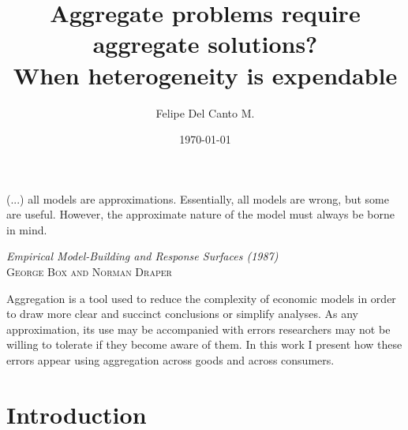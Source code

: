 \documentclass[english, a4paper, 12pt]{article}
\author{Felipe Del Canto M.}
\title{Aggregate problems require aggregate solutions? \\ When heterogeneity is expendable}
\date{\today}
\begin{document}
\maketitle
\thispagestyle{empty}


\vfill
\epigraph{(...) all models are approximations. Essentially, all models are wrong, but some are useful. However, %
the approximate nature of the model must always be borne in mind.}{\textit{Empirical Model-Building and Response Surfaces (1987)} \\ \textsc{George Box and Norman Draper}}

\vfill
{\abstract Aggregation is a tool used to reduce the complexity of economic models in order to draw more clear and succinct conclusions or simplify analyses. As any approximation, its use may be accompanied with errors researchers may not be willing to tolerate if they become aware of them. In this work I present how these errors appear using aggregation across goods and across consumers. }
\vfill


\newpage
\section{Introduction}
\end{document}
